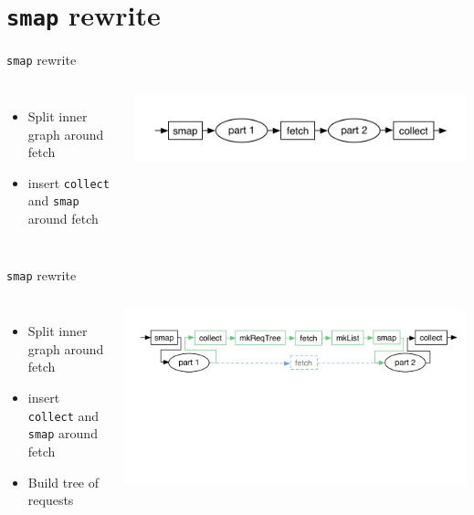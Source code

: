 \documentclass[utf8x,10pt,aspectratio=169]{beamer}
\begin{document}
\section{\texttt{smap} rewrite}
\begin{frame}{\texttt{smap} rewrite}
	\begin{columns}
		\begin{itemize}
			\item<2-> Split inner graph around fetch
			\item<3-> insert \texttt{collect} and \texttt{smap} around fetch
		\end{itemize}
		\includegraphics[width=\textwidth]{graphs/smap-rewrite-original}
	\end{columns}
		
\end{frame}

\addtocounter{framenumber}{-1}

\begin{frame}{\texttt{smap} rewrite}
	\begin{columns}
		\column{0.4\textwidth}	

		\begin{itemize}
			\item Split inner graph around fetch
			\item insert \texttt{collect} and \texttt{smap} around fetch
			\item Build tree of requests
		\end{itemize}
		\column{0.6\textwidth}
		\includegraphics[width=\textwidth]{graphs/smap-rewrite}
	\end{columns}
		
\end{frame}
\end{document}
